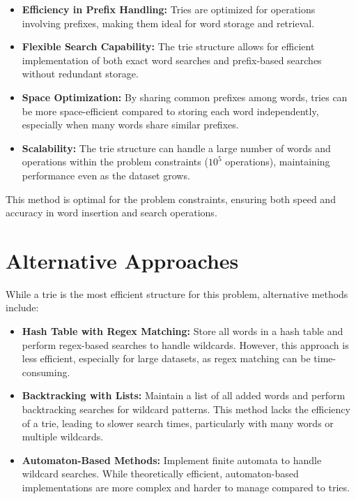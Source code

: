 \begin{itemize}
    \item \textbf{Efficiency in Prefix Handling:}  
    Tries are optimized for operations involving prefixes, making them ideal for word storage and retrieval.
    
    \item \textbf{Flexible Search Capability:}  
    The trie structure allows for efficient implementation of both exact word searches and prefix-based searches without redundant storage.
    
    \item \textbf{Space Optimization:}  
    By sharing common prefixes among words, tries can be more space-efficient compared to storing each word independently, especially when many words share similar prefixes.
    
    \item \textbf{Scalability:}  
    The trie structure can handle a large number of words and operations within the problem constraints (\(10^5\) operations), maintaining performance even as the dataset grows.
\end{itemize}

This method is optimal for the problem constraints, ensuring both speed and accuracy in word insertion and search operations.

\section*{Alternative Approaches}

While a trie is the most efficient structure for this problem, alternative methods include:

\begin{itemize}
    \item \textbf{Hash Table with Regex Matching:}  
    Store all words in a hash table and perform regex-based searches to handle wildcards. However, this approach is less efficient, especially for large datasets, as regex matching can be time-consuming.
    
    \item \textbf{Backtracking with Lists:}  
    Maintain a list of all added words and perform backtracking searches for wildcard patterns. This method lacks the efficiency of a trie, leading to slower search times, particularly with many words or multiple wildcards.
    
    \item \textbf{Automaton-Based Methods:}  
    Implement finite automata to handle wildcard searches. While theoretically efficient, automaton-based implementations are more complex and harder to manage compared to tries.
\end{itemize}

